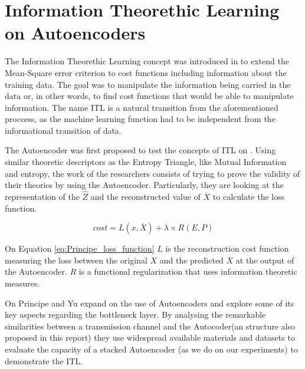 \section{Information Theorethic Learning on Autoencoders}

The Information Theorethic Learning concept was introduced in \cite{Principe_2000} to extend the Mean-Square error criterion to cost functions including information about the training data. The goal was to manipulate the information being carried in the data or, in other words, to find cost functions that would be able to manipulate information. The name ITL is a natural transition from the aforementioned proccess, as the machine learning function had to be independent from the informational transition of data. \par

The Autoencoder was first proposed to test the concepts of ITL on \cite{Santana_2016}. Using similar theoretic descriptors as the Entropy Triangle, like Mutual Information and entropy, the work of the researchers consists of trying to prove the validity of their theories by using the Autoencoder. Particularly, they are looking at the representation of the $\hat{Z}$ and the reconstructed value of $\overline{X}$ to calculate the loss function.

\begin{equation}\label{eq:Principe_loss_function}
cost = L(x,\overline{X}) + \lambda \times R(E,P)
\end{equation}

On Equation \ref{eq:Principe_loss_function} $L$ is the reconstruction cost function measuring the loss between the original $X$ and the predicted $\overline{X}$ at the output of the Autoencoder. $R$ is a functional regularization that uses information theoretic measures.\par

On \cite{Yu_2019} Principe and Yu expand on the use of Autoencoders and explore some of its key aspects regarding the bottleneck layer. By analysing the remarkable similarities between a transmission channel and the Autocoder(an structure also proposed in this report) they use widespread available materials and datasets to evaluate the capacity of a stacked Autoencoder (as we do on our experiments) to demonstrate the ITL. 